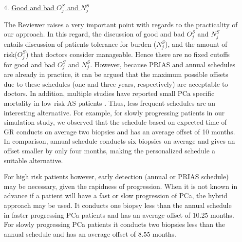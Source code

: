 \begin{enumerate}
 \item[4.] \underline{Good and bad $O^S_j$ and $N^S_j$}

 The Reviewer raises a very important point with regards to the practicality of our approach. In this regard, the discussion of good and bad $O^S_j$ and $N^S_j$ entails discussion of patients tolerance for burden ($N^S_j$), and the amount of risk($O^S_j$) that doctors consider manageable. Hence there are no fixed cutoffs for good and bad $O^S_j$ and $N^S_j$. However, because PRIAS and annual schedules are already in practice, it can be argued that the maximum possible offsets due to these schedules (one and three years, respectively) are acceptable to doctors. In addition, multiple studies have reported small PCa specific mortality in low risk AS patients \citep{loeb2016immediate,tosoian2011active,klotz2009clinical}. Thus, less frequent schedules are an interesting alternative. For example, for slowly progressing patients in our simulation study, we observed that the schedule based on expected time of GR conducts on average two biopsies and has an average offset of 10 months. In comparison, annual schedule conducts six biopsies on average and gives an offset smaller by only four months, making the personalized schedule a suitable alternative. 

 For high risk patients however, early detection (annual or PRIAS schedule) may be necessary, given the rapidness of progression. When it is not known in advance if a patient will have a fast or slow progression of PCa, the hybrid approach may be used. It conducts one biopsy less than the annual schedule in faster progressing PCa patients and has an average offset of 10.25 months. For slowly progressing PCa patients it conducts two biopsies less than the annual schedule and has an average offset of 8.55 months.

\end{enumerate}

